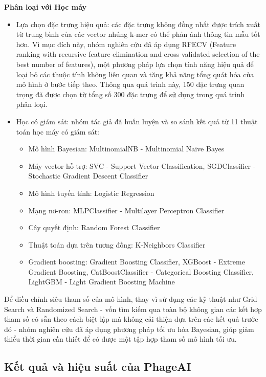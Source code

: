 \textbf{Phân loại với Học máy}
\begin{itemize}
    \item Lựa chọn đặc trưng hiệu quả: các đặc trưng không đồng nhất được trích xuất từ trung bình của các vector nhúng k-mer có thể phản ánh thông tin mẫu tốt hơn. Vì mục đích này, nhóm nghiên cứu đã áp dụng RFECV (Feature ranking with recursive feature elimination and cross-validated selection of the best number of features), một phương pháp lựa chọn tính năng hiệu quả để loại bỏ các thuộc tính không liên quan và tăng khả năng tổng quát hóa của mô hình ở bước tiếp theo. Thông qua quá trình này, 150 đặc trưng quan trọng đã được chọn từ tổng số 300 đặc trưng để sử dụng trong quá trình phân loại.
    \item Học có giám sát: nhóm tác giả đã huấn luyện và so sánh kết quả từ 11 thuật toán học máy có giám sát:
    \begin{itemize}
        \item Mô hình Bayesian: MultinomialNB - Multinomial Naive Bayes
        \item Máy vector hỗ trợ: SVC - Support Vector Classification, SGDClassifier - Stochastic Gradient Descent Classifier
        \item Mô hình tuyến tính: Logistic Regression
        \item Mạng nơ-ron: MLPClassifier - Multilayer Perceptron Classifier
        \item Cây quyết định: Random Forest Classifier
        \item Thuật toán dựa trên tương đồng: K-Neighbors Classifier
        \item Gradient boosting: Gradient Boosting Classifier, XGBoost - Extreme Gradient Boosting, CatBoostClassifier - Categorical Boosting Classifier, LightGBM - Light Gradient Boosting Machine
    \end{itemize}
\end{itemize}

Để điều chỉnh siêu tham số của mô hình, thay vì sử dụng các kỹ thuật như Grid Search và Randomized Search - vốn tìm kiếm qua toàn bộ không gian các kết hợp tham số có sẵn theo cách biệt lập mà không cải thiện dựa trên các kết quả trước đó - nhóm nghiên cứu đã áp dụng phương pháp tối ưu hóa Bayesian, giúp giảm thiểu thời gian cần thiết để có được một tập hợp tham số mô hình tối ưu.

\subsection{Kết quả và hiệu suất của PhageAI}

